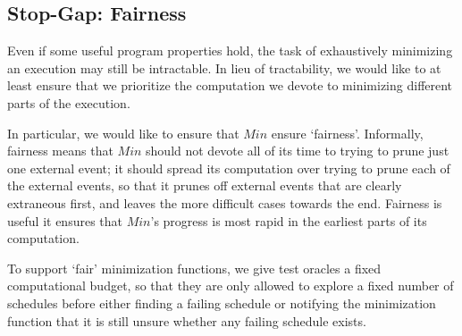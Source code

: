  

\subsection{Stop-Gap: Fairness}

Even if some useful program properties hold, the task of exhaustively
minimizing an execution may still be intractable. In lieu of tractability, we
would like to at least ensure that we prioritize the computation we devote to
minimizing different parts of the execution.

In particular, we would like to ensure that $Min$ ensure `fairness'. Informally,
fairness means that
$Min$ should not devote all of its time to trying to prune just one
external event; it should spread its computation over trying to prune each
of the external events, so that it prunes off external events that are clearly
extraneous first, and leaves the more difficult cases towards the end.
Fairness is useful it ensures that $Min$'s progress is most rapid in the
earliest parts of its computation.

To support `fair' minimization functions, we give test oracles a fixed
computational budget, so that they are only allowed to explore a fixed
number of schedules before either finding a failing schedule or notifying the
minimization function that it is still unsure whether any failing schedule
exists.


